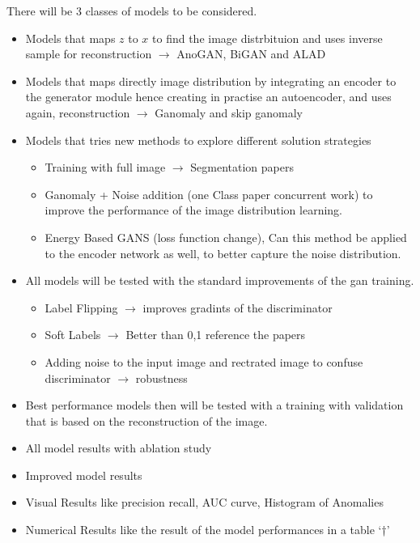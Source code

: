 There will be 3 classes of models to be considered. 
\begin{itemize}
    \item Models that maps $z$ to $x$ to find the image distrbituion and uses inverse sample for
    reconstruction $\rightarrow$ AnoGAN, BiGAN and ALAD
    \item Models that maps directly image distribution by integrating an encoder to the generator
    module hence creating in practise an autoencoder, and uses again, reconstruction $\rightarrow$
    Ganomaly and skip ganomaly
    \item Models that tries new methods to explore different solution strategies \begin{itemize}
        \item Training with full image $\rightarrow$ Segmentation papers
        \item Ganomaly + Noise addition (one Class paper concurrent work) to improve the performance
        of the image distribution learning.
        \item Energy Based GANS (loss function change), Can this method be applied to the encoder
        network as well, to better capture the noise distribution.
    \end{itemize}
\end{itemize}

\begin{itemize}
    \item All models will be tested with the standard improvements of the gan training. \begin{itemize}
        \item Label Flipping $\rightarrow$ improves gradints of the discriminator
        \item Soft Labels $\rightarrow$ Better than 0,1 reference the papers
        \item Adding noise to the input image and rectrated image to confuse discriminator
        $\rightarrow$ robustness
    \end{itemize}
    \item Best performance models then will be tested with a training with validation that is based
    on the reconstruction of the image. 
    \item All model results with ablation study
    \item Improved model results
    \item Visual Results like precision recall, AUC curve, Histogram of Anomalies
    \item Numerical Results like the result of the model performances in a table `†'
\end{itemize}

\endgroup